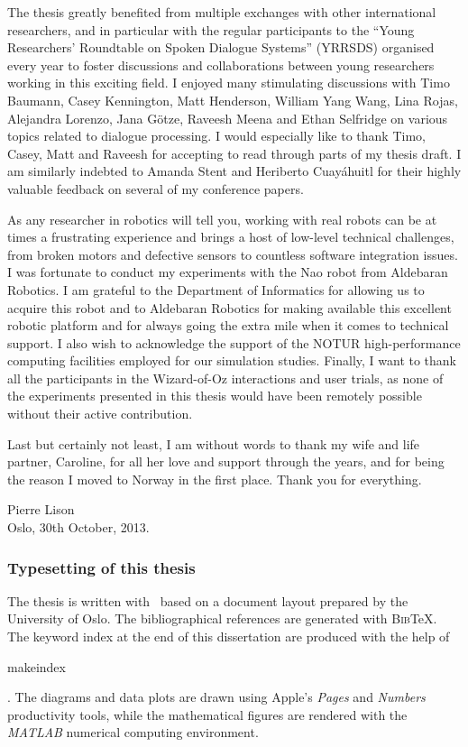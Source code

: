 The thesis greatly benefited from multiple exchanges with other international researchers, and in particular with the regular participants to the ``Young Researchers' Roundtable on Spoken Dialogue Systems'' (YRRSDS) organised every year to foster discussions and collaborations between young researchers working in this exciting field. I enjoyed many stimulating discussions with Timo Baumann, Casey Kennington, Matt Henderson, William Yang Wang, Lina Rojas, Alejandra Lorenzo, Jana G\"otze, Raveesh Meena and Ethan Selfridge on various topics related to dialogue processing.  I would especially like to thank Timo, Casey, Matt and Raveesh for accepting to read through parts of my thesis draft. I am similarly indebted to Amanda Stent and Heriberto Cuay\'{a}huitl for their highly valuable feedback on several of my conference papers.

As any researcher in robotics will tell you, working with real robots can be at times a frustrating experience and brings a host of low-level technical challenges, from broken motors and defective sensors to countless software integration issues. I was fortunate to conduct my experiments with the Nao robot from Aldebaran Robotics.  I am grateful to the Department of Informatics for allowing us to acquire this robot and to Aldebaran Robotics for making available this excellent robotic platform and for always going the extra mile when it comes to technical support. I also wish to acknowledge the support of the NOTUR high-performance computing facilities employed for our simulation studies. Finally, I want to thank all the participants in the Wizard-of-Oz interactions and user trials, as none of the experiments presented in this thesis would have been remotely possible without their active contribution.

Last but certainly not least, I am without words to thank my wife and life partner, Caroline, for all her love and support through the years, and for being the reason I moved to Norway in the first place. Thank you for everything.

\vspace{1cm}

\begin{flushright}Pierre Lison \\ Oslo, 30th October, 2013. \end{flushright}

\null 
\vfill
\begin{footnotesize}\subsubsection*{Typesetting of this thesis}
The thesis is written with \LaTeXe \ based on a document layout prepared by the University of Oslo. The bibliographical references are generated with \textsc{Bib}\negthinspace\TeX.  The keyword index at the end of this dissertation are produced with the help of \begin{scriptsize}\textsf{makeindex}\end{scriptsize}. The diagrams and data plots are drawn using Apple's \textit{Pages} and \textit{Numbers} productivity tools, while the mathematical figures are rendered with the \textit{MATLAB} numerical computing environment.\end{footnotesize}
